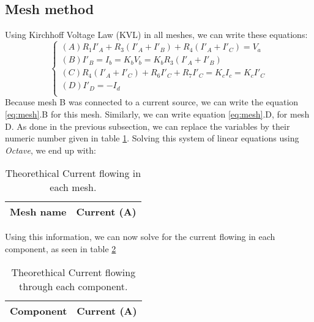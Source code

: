 \subsection{Mesh method}
Using Kirchhoff Voltage Law (KVL) in all meshes, we can write these equations:
\begin{equation}\label{eq:mesh}
\begin{cases}
  (A) R_1I'_A + R_3(I'_A + I'_B) + R_4(I'_A + I'_C) = V_a \\
  (B) I'_B = I_b = K_bV_b = K_bR_3(I'_A + I'_B) \\
  (C) R_4(I'_A+I'_C) + R_6I'_C + R_7I'_C = K_cI_c = K_cI'_C \\
  (D) I'_D = -I_d \\
\end{cases}
\end{equation}
Because mesh B was connected to a current source, we can write the equation \ref{eq:mesh}.B for this mesh. Similarly, we can write equation \ref{eq:mesh}.D, for mesh D. As done in the previous subsection, we can replace the variables by their numeric number given in table \ref{tab:mesh}. Solving this system of linear equations using \textit{Octave}, we end up with:
\begin{table}[H]
  \centering
  \begin{tabular}{|l|r|}
    \hline
        {\bf Mesh name} & {\bf Current (A)} \\ \hline
        
  \end{tabular}
  \caption{Theorethical Current flowing in each mesh.}
  \label{tab:mesh}
\end{table}
Using this information, we can now solve for the current flowing in each component, as seen in table \ref{tab:comp}
\begin{table}[H]
  \centering
  \begin{tabular}{|l|r|}
    \hline
        {\bf Component} & {\bf Current (A)} \\ \hline
        
  \end{tabular}
  \caption{Theorethical Current flowing through each component.}
  \label{tab:comp}
\end{table}
\par



